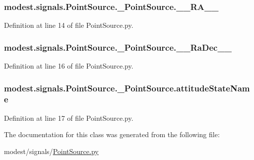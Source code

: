 \subsubsection[{\texorpdfstring{\+\_\+\+\_\+\+R\+A\+\_\+\+\_\+}{__RA__}}]{\setlength{\rightskip}{0pt plus 5cm}modest.\+signals.\+Point\+Source.\+\_\+\+Point\+Source.\+\_\+\+\_\+\+R\+A\+\_\+\+\_\+\hspace{0.3cm}{\ttfamily [private]}}\hypertarget{classmodest_1_1signals_1_1PointSource_1_1__PointSource_a0da77e41ae1beb2693c8af264ce2e47a}{}\label{classmodest_1_1signals_1_1PointSource_1_1__PointSource_a0da77e41ae1beb2693c8af264ce2e47a}


Definition at line 14 of file Point\+Source.\+py.

\subsubsection[{\texorpdfstring{\+\_\+\+\_\+\+Ra\+Dec\+\_\+\+\_\+}{__RaDec__}}]{\setlength{\rightskip}{0pt plus 5cm}modest.\+signals.\+Point\+Source.\+\_\+\+Point\+Source.\+\_\+\+\_\+\+Ra\+Dec\+\_\+\+\_\+\hspace{0.3cm}{\ttfamily [private]}}\hypertarget{classmodest_1_1signals_1_1PointSource_1_1__PointSource_a91e88bd47be277788194ad890facbdbd}{}\label{classmodest_1_1signals_1_1PointSource_1_1__PointSource_a91e88bd47be277788194ad890facbdbd}


Definition at line 16 of file Point\+Source.\+py.

\subsubsection[{\texorpdfstring{attitude\+State\+Name}{attitudeStateName}}]{\setlength{\rightskip}{0pt plus 5cm}modest.\+signals.\+Point\+Source.\+\_\+\+Point\+Source.\+attitude\+State\+Name}\hypertarget{classmodest_1_1signals_1_1PointSource_1_1__PointSource_ae61b56a5682a25a943a9e1ea2108bf4c}{}\label{classmodest_1_1signals_1_1PointSource_1_1__PointSource_ae61b56a5682a25a943a9e1ea2108bf4c}


Definition at line 17 of file Point\+Source.\+py.



The documentation for this class was generated from the following file\+:\begin{DoxyCompactItemize}
\item 
modest/signals/\hyperlink{PointSource_8py}{Point\+Source.\+py}\end{DoxyCompactItemize}
